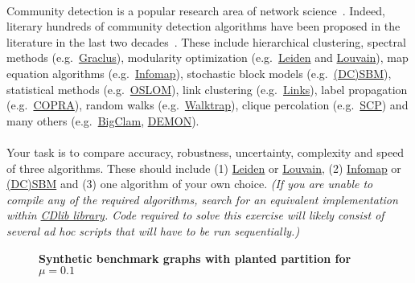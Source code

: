 \documentclass[11pt,a4paper]{article}
\newcommand{\hint}[1]{{\it (#1)}}
\begin{document}
\paragraph{} Community detection is a popular research area of network science~\cite{New12}. Indeed, literary hundreds of community detection algorithms have been proposed in the literature in the last two decades~\cite{For10,FH16}. These include hierarchical clustering, spectral methods (e.g.\ \href{http://www.cs.utexas.edu/users/dml/Software/graclus.html}{Graclus}), modularity optimization (e.g.\ \href{https://github.com/vtraag/leidenalg}{Leiden} and \href{https://sites.google.com/site/findcommunities/}{Louvain}), map equation algorithms (e.g.\ \href{http://mapequation.org/code.html}{Infomap}), stochastic block models (e.g.\ \href{https://graph-tool.skewed.de/static/doc/demos/inference/inference.html#the-stochastic-block-model-sbm}{(DC)SBM}), statistical methods (e.g.\ \href{http://www.oslom.org}{OSLOM}), link clustering (e.g.\ \href{https://github.com/bagrow/linkcomm}{Links}), label propagation (e.g.\ \href{http://gregory.org/research/networks/software/copra.html}{COPRA}), random walks (e.g.\ \href{https://www-complexnetworks.lip6.fr/~latapy/PP/walktrap.html}{Walktrap}), clique percolation (e.g.\ \href{http://complex.cs.aalto.fi/resources/software/}{SCP}) and many others (e.g.\ \href{https://github.com/snap-stanford/snap/tree/master/examples/bigclam}{BigClam}, \href{http://www.michelecoscia.com/?page_id=42}{DEMON}). 

\paragraph{} Your task is to compare accuracy, robustness, uncertainty, complexity and speed of three algorithms. These should include (1) \href{https://github.com/vtraag/leidenalg}{Leiden} or \href{https://sites.google.com/site/findcommunities/}{Louvain}, (2) \href{http://mapequation.org/code.html}{Infomap} or \href{https://graph-tool.skewed.de/static/doc/demos/inference/inference.html#the-stochastic-block-model-sbm}{(DC)SBM} and (3) one algorithm of your own choice. \hint{If you are unable to compile any of the required algorithms, search for an equivalent implementation within \href{https://github.com/GiulioRossetti/cdlib}{CDlib library}. Code required to solve this exercise will likely consist of several ad hoc scripts that will have to be run sequentially.}

\begin{figure}[t] \centering
	\caption{{\bf Synthetic benchmark graphs with planted partition for $\mu=0.1$}}
	\label{fig:benchmarks}
\end{figure}
\end{document}
